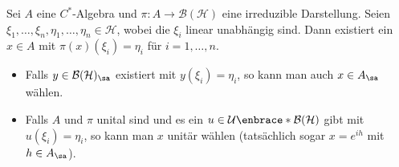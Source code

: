 \begin{satz}[{name={Kadisons Transitivitätssatz}},label=satz:716]
	Sei $A$ eine $C^*$-Algebra und $\pi \colon A \to \mathcal{B}(\mathcal{H})$ eine irreduzible Darstellung.
	Seien $\xi_1,\ldots ,\xi_n, \eta_1, \ldots , \eta_n \in \mathcal{H}$, wobei die $\xi_i$ linear unabhängig sind.
	Dann existiert ein $x \in A$ mit $\pi(x)(\xi_i) = \eta_i$ für $i=1,\ldots ,n$.
	\begin{itemize}
		\item Falls $y \in \mathcal{B}(\mathcal{H})_\sa$ existiert mit $y(\xi_i)=\eta_i$, so kann man auch $x \in A_\sa$ wählen.
		\item Falls $A$ und $\pi$ unital sind und es ein $u \in \mathcal{U} \enbrace*{\mathcal{B}(\mathcal{H})}$ gibt mit $u(\xi_i)=\eta_i$, so kann man $x$ unitär wählen (tatsächlich sogar $x=e^{i h}$ mit $h \in A_\sa$).
	\end{itemize}
\end{satz}
